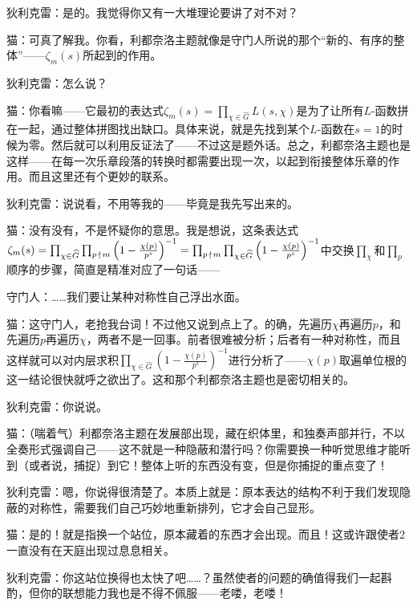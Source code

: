 {狄利克雷：是的。我觉得你又有一大堆理论要讲了对不对？

猫：可真了解我。你看，利都奈洛主题就像是守门人所说的那个“新的、有序的整体”——\(\zeta_m(s)\)所起到的作用。                                

狄利克雷：怎么说？

猫：你看嘛——它最初的表达式\(\zeta_m(s)=\prod_{\chi\in\widehat{G}}L(s,\chi)\)是为了让所有\(L\)-函数拼在一起，通过整体拼图找出缺口。具体来说，就是先找到某个\(L\)-函数在\(s=1\)的时候为零。然后就可以利用反证法了——不过这是题外话。总之，利都奈洛主题也是这样——在每一次乐章段落的转换时都需要出现一次，以起到衔接整体乐章的作用。而且这里还有个更妙的联系。

狄利克雷：说说看，不用等我的——毕竟是我先写出来的。

猫：没有没有，不是怀疑你的意思。我是想说，这条表达式\(\zeta_m(s)\\=\prod_{\chi\in\widehat{G}}\prod_{p\,\nmid\, m}\left(1-\frac{\chi(p)}{p^{s}}\right)^{-1}=\prod_{p\,\nmid\, m}\prod_{\chi\in\widehat{G}}\left(1-\frac{\chi(p)}{p^{s}}\right)^{-1}\)中交换\(\prod_\chi\)和\(\prod_p\)顺序的步骤，简直是精准对应了一句话——

守门人：……我们要让某种对称性自己浮出水面。

猫：这守门人，老抢我台词！不过他又说到点上了。的确，先遍历\(\chi\)再遍历\(p\)，和先遍历\(p\)再遍历\(\chi\)，两者不是一回事。前者很难被分析；后者有一种对称性，而且这样就可以对内层求积\(\prod_{\chi\in\widehat{G}}\left(1-\frac{\chi(p)}{p^{s}}\right)^{-1}\)进行分析了——\(\chi(p)\)取遍单位根的这一结论很快就呼之欲出了。这和那个利都奈洛主题也是密切相关的。

狄利克雷：你说说。

猫：（喘着气）利都奈洛主题在发展部出现，藏在织体里，和独奏声部并行，不以全奏形式强调自己——这不就是一种隐蔽和潜行吗？你需要换一种听觉思维才能听到（或者说，捕捉）到它！整体上听的东西没有变，但是你捕捉的重点变了！

狄利克雷：嗯，你说得很清楚了。本质上就是：原本表达的结构不利于我们发现隐蔽的对称性，需要我们自己巧妙地重新排列，它才会自己显形。

猫：是的！就是指换一个站位，原本藏着的东西才会出现。而且！这或许跟使者2一直没有在天庭出现过息息相关。

狄利克雷：你这站位换得也太快了吧……？虽然使者的问题的确值得我们一起斟酌，但你的联想能力我也是不得不佩服——老喽，老喽！

}
